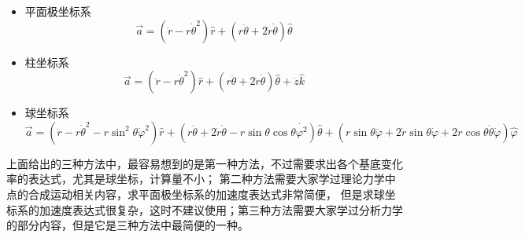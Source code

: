 \documentclass{ctexart}
\begin{document}
    \begin{itemize}
        \item 平面极坐标系
            \begin{equation*}
                \vec{a} = (\ddot{r}-r\dot{\theta}^2)\hat{r}+
                (r\ddot{\theta}+2\dot{r}\dot{\theta})\hat{\theta}
            \end{equation*}
        \item 柱坐标系
            \begin{equation*}
                \vec{a} = (\ddot{r}-r\dot{\theta}^2)\hat{r}+
                (r\ddot{\theta}+2\dot{r}\dot{\theta})\hat{\theta}+
                \dot{z}\hat{k}
            \end{equation*}
        \item 球坐标系
            \begin{equation*}
                \vec{a} = (\ddot{r}-r\dot{\theta}^2-r\sin^2\theta\dot{\varphi}^2)\hat{r}+
                (r\ddot{\theta}+2\dot{r}\dot{\theta}-r\sin\theta\cos\theta\dot{\varphi^2})\hat{\theta}+
                (r\sin\theta\ddot{\varphi}+2\dot{r}\sin\theta\dot{\varphi}+
                2r\cos\theta\dot{\theta}\dot{\varphi})\hat{\varphi}
            \end{equation*}
    \end{itemize}

    上面给出的三种方法中，最容易想到的是第一种方法，不过需要求出各个基底变化率的表达式，尤其是球坐标，计算量不小；
    第二种方法需要大家学过理论力学中点的合成运动相关内容，求平面极坐标系的加速度表达式非常简便，
    但是求球坐标系的加速度表达式很复杂，这时不建议使用；第三种方法需要大家学过分析力学的部分内容，但是它是三种方法中最简便的一种。
\end{document}
